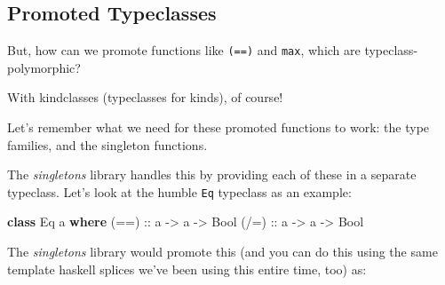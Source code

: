 \documentclass[]{article}
\newenvironment{Shaded}{}{}
\newcommand{\CommentTok}[1]{\textcolor[rgb]{0.38,0.63,0.69}{\textit{#1}}}
\newcommand{\DataTypeTok}[1]{\textcolor[rgb]{0.56,0.13,0.00}{#1}}
\newcommand{\FunctionTok}[1]{\textcolor[rgb]{0.02,0.16,0.49}{#1}}
\newcommand{\KeywordTok}[1]{\textcolor[rgb]{0.00,0.44,0.13}{\textbf{#1}}}
\newcommand{\NormalTok}[1]{#1}
\newcommand{\OtherTok}[1]{\textcolor[rgb]{0.00,0.44,0.13}{#1}}
\begin{document}
\hypertarget{promoted-typeclasses}{%
\subsection{Promoted Typeclasses}\label{promoted-typeclasses}}

But, how can we promote functions like \texttt{(==)} and \texttt{max}, which are
typeclass-polymorphic?

With kindclasses (typeclasses for kinds), of course!

Let's remember what we need for these promoted functions to work: the type
families, and the singleton functions.

The \emph{singletons} library handles this by providing each of these in a
separate typeclass. Let's look at the humble \texttt{Eq} typeclass as an
example:

\begin{Shaded}
\begin{Highlighting}[]
\KeywordTok{class} \DataTypeTok{Eq}\NormalTok{ a }\KeywordTok{where}
\OtherTok{    (==) ::}\NormalTok{ a }\OtherTok{->}\NormalTok{ a }\OtherTok{->} \DataTypeTok{Bool}
\OtherTok{    (/=) ::}\NormalTok{ a }\OtherTok{->}\NormalTok{ a }\OtherTok{->} \DataTypeTok{Bool}
\end{Highlighting}
\end{Shaded}

The \emph{singletons} library would promote this (and you can do this using the
same template haskell splices we've been using this entire time, too) as:

\begin{Shaded}
\end{Shaded}
\end{document}
